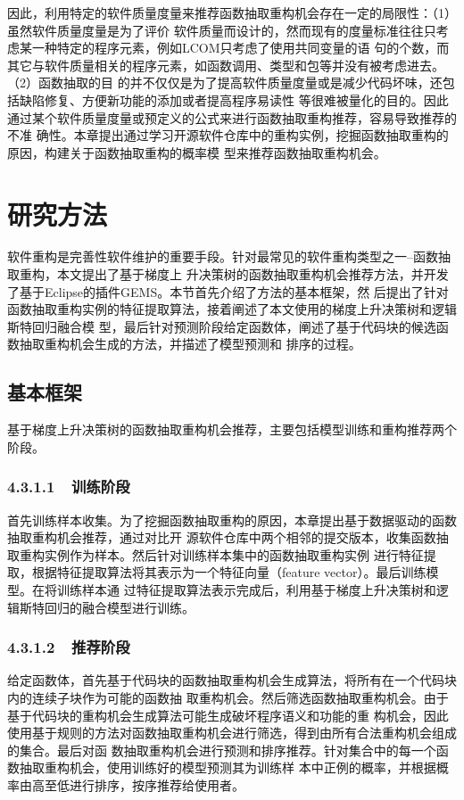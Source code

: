 因此，利用特定的软件质量度量来推荐函数抽取重构机会存在一定的局限性：（1）虽然软件质量度量是为了评价
软件质量而设计的，然而现有的度量标准往往只考虑某一种特定的程序元素，例如LCOM只考虑了使用共同变量的语
句的个数，而其它与软件质量相关的程序元素，如函数调用、类型和包等并没有被考虑进去。（2）函数抽取的目
的并不仅仅是为了提高软件质量度量或是减少代码坏味，还包括缺陷修复、方便新功能的添加或者提高程序易读性
等很难被量化的目的。因此通过某个软件质量度量或预定义的公式来进行函数抽取重构推荐，容易导致推荐的不准
确性。本章提出通过学习开源软件仓库中的重构实例，挖掘函数抽取重构的原因，构建关于函数抽取重构的概率模
型来推荐函数抽取重构机会。

\section{研究方法}
软件重构是完善性软件维护的重要手段。针对最常见的软件重构类型之一--函数抽取重构，本文提出了基于梯度上
升决策树的函数抽取重构机会推荐方法，并开发了基于Eclipse的插件GEMS。本节首先介绍了方法的基本框架，然
后提出了针对函数抽取重构实例的特征提取算法，接着阐述了本文使用的梯度上升决策树和逻辑斯特回归融合模
型，最后针对预测阶段给定函数体，阐述了基于代码块的候选函数抽取重构机会生成的方法，并描述了模型预测和
排序的过程。

\subsection{基本框架}
基于梯度上升决策树的函数抽取重构机会推荐，主要包括模型训练和重构推荐两个阶段。

\subsubsection{4.3.1.1~~训练阶段}

首先训练样本收集。为了挖掘函数抽取重构的原因，本章提出基于数据驱动的函数抽取重构机会推荐，通过对比开
源软件仓库中两个相邻的提交版本，收集函数抽取重构实例作为样本。然后针对训练样本集中的函数抽取重构实例
进行特征提取，根据特征提取算法将其表示为一个特征向量（feature vector）。最后训练模型。在将训练样本通
过特征提取算法表示完成后，利用基于梯度上升决策树和逻辑斯特回归的融合模型进行训练。


\subsubsection{4.3.1.2~~推荐阶段}

给定函数体，首先基于代码块的函数抽取重构机会生成算法，将所有在一个代码块内的连续子块作为可能的函数抽
取重构机会。然后筛选函数抽取重构机会。由于基于代码块的重构机会生成算法可能生成破坏程序语义和功能的重
构机会，因此使用基于规则的方法对函数抽取重构机会进行筛选，得到由所有合法重构机会组成的集合。最后对函
数抽取重构机会进行预测和排序推荐。针对集合中的每一个函数抽取重构机会，使用训练好的模型预测其为训练样
本中正例的概率，并根据概率由高至低进行排序，按序推荐给使用者。

